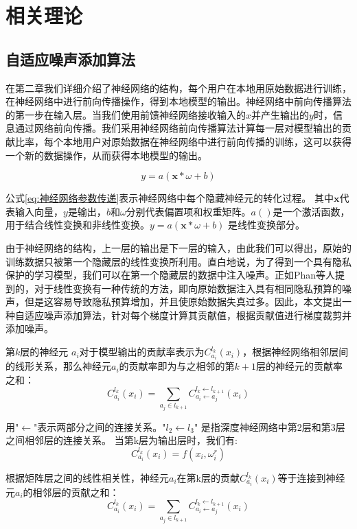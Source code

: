 \section{相关理论}

\subsection{自适应噪声添加算法}
在第二章我们详细介绍了神经网络的结构，每个用户在本地用原始数据进行训练，在神经网络中进行前向传播操作，得到本地模型的输出。神经网络中前向传播算法的第一步在输入层。当我们使用前馈神经网络接收输入的$x$并产生输出的$y$时，信息通过网络前向传播。我们采用神经网络前向传播算法计算每一层对模型输出的贡献比率，每个本地用户对原始数据在神经网络中进行前向传播的训练，这可以获得一个新的数据操作，从而获得本地模型的输出。

\begin{equation}\label{eq:神经网络参数传递}
y=a(\mathbf{x} * \omega+b)
\end{equation}

公式\ref{eq:神经网络参数传递}表示神经网络中每个隐藏神经元的转化过程。
其中$\mathbf{x}$代表输入向量，$y$是输出，$b$和$\omega$分别代表{}偏置项和权重矩阵。$a()$是一个激活函数，用于结合线性变换和非线性变换。$y=a(\mathbf{x} * \omega+b)$ 是线性变换部分。

由于神经网络的结构，上一层的输出是下一层的输入，由此我们可以得出，原始的训练数据只被第一个隐藏层的线性变换所利用。直白地说，为了得到一个具有隐私保护的学习模型，我们可以在第一个隐藏层的数据中注入噪声。正如Phan等人提到的，对于线性变换有一种传统的方法，即向原始数据注入具有相同隐私预算的噪声，但是这容易导致隐私预算增加，并且使原始数据失真过多。因此，本文提出一种自适应噪声添加算法，针对每个梯度计算其贡献值，根据贡献值进行梯度裁剪并添加噪声。

第$k$层的神经元 $a_{i}$对于模型输出的贡献率表示为$C_{a_{i}}^{l_{k}}\left(x_{i}\right)$，根据神经网络相邻层间的线形关系，那么神经元$a_{i}$的贡献率即为与之相邻的第$k+1$层的神经元的贡献率之和：
$$
C_{a_{i}}^{l_{k}}\left(x_{i}\right)=\sum_{a_{j} \in l_{k+1}} C_{a_{i} \leftarrow a_{j}}^{l_{k} \leftarrow l_{k+1}}\left(x_{i}\right)
$$

用"$\leftarrow$"表示两部分之间的连接关系。"$l_{2} \leftarrow l_{3}$" 是指深度神经网络中第2层和第3层之间相邻层的连接关系。
当第k层为输出层时，我们有:
\begin{equation}
C_{a_{i}}^{l_{k}}\left(x_{i}\right)=f\left(x_{i}, \omega_{i}^{r}\right)
\end{equation}

根据矩阵层之间的线性相关性，神经元$a_{i}$在第k层的贡献$C_{a_{i}}^{l_{k}}\left(x_{i}\right)$等于连接到神经元$a_{i}$的相邻层的贡献之和：
\begin{equation}\label{eq:层间传播1}
C_{a_{i}}^{l_{k}}\left(x_{i}\right)=\sum_{a_{j} \in l_{k+1}} C_{a_{i} \leftarrow a_{j}}^{l_{k} \leftarrow l_{k+1}}\left(x_{i}\right)
\end{equation}

